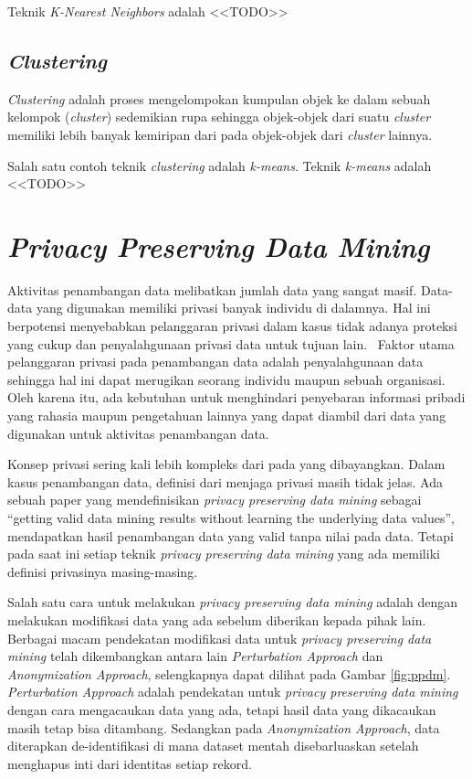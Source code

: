Teknik \textit{K-Nearest Neighbors} adalah <<TODO>>

\subsection{\textit{Clustering}}
\label{subsec:clustering}

\textit{Clustering} adalah proses mengelompokan kumpulan objek ke dalam sebuah kelompok (\textit{cluster}) sedemikian rupa sehingga objek-objek dari suatu \textit{cluster} memiliki lebih banyak kemiripan dari pada objek-objek dari \textit{cluster} lainnya.~\cite{mendes:17:ppdmieee} 

Salah satu contoh teknik \textit{clustering} adalah \textit{k-means}. Teknik \textit{k-means} adalah <<TODO>>

\section{\textit{Privacy Preserving Data Mining}}
\label{sec:ppdm}

Aktivitas penambangan data melibatkan jumlah data yang sangat masif. Data-data yang digunakan memiliki privasi banyak individu di dalamnya. Hal ini berpotensi menyebabkan pelanggaran privasi dalam kasus tidak adanya proteksi yang cukup dan penyalahgunaan privasi data untuk tujuan lain.~\cite{rezaseifi:11:ppdm} Faktor utama pelanggaran privasi pada penambangan data adalah penyalahgunaan data sehingga hal ini dapat merugikan seorang individu maupun sebuah organisasi. Oleh karena itu, ada kebutuhan untuk menghindari penyebaran informasi pribadi yang rahasia maupun pengetahuan lainnya yang dapat diambil dari data yang digunakan untuk aktivitas penambangan data.

Konsep privasi sering kali lebih kompleks dari pada yang dibayangkan. Dalam kasus penambangan data, definisi dari menjaga privasi masih tidak jelas. Ada sebuah paper yang mendefinisikan \textit{privacy preserving data mining} sebagai “getting valid data mining results without learning the underlying data values”, mendapatkan hasil penambangan data yang valid tanpa  nilai pada data. Tetapi pada saat ini setiap teknik \textit{privacy preserving data mining} yang ada memiliki definisi privasinya masing-masing. 

Salah satu cara untuk melakukan \textit{privacy preserving data mining} adalah dengan melakukan modifikasi data yang ada sebelum diberikan kepada pihak lain. Berbagai macam pendekatan modifikasi data untuk \textit{privacy preserving data mining} telah dikembangkan antara lain \textit{Perturbation Approach} dan \textit{Anonymization Approach}, selengkapnya dapat dilihat pada Gambar \ref{fig:ppdm}.~\cite{rezaseifi:11:ppdm} \textit{Perturbation Approach} adalah pendekatan untuk \textit{privacy preserving data mining} dengan cara mengacaukan data yang ada, tetapi hasil data yang dikacaukan masih tetap bisa ditambang. Sedangkan pada \textit{Anonymization Approach}, data diterapkan de-identifikasi di mana dataset mentah disebarluaskan setelah menghapus inti dari identitas setiap rekord.~\cite{rezaseifi:11:ppdm}

